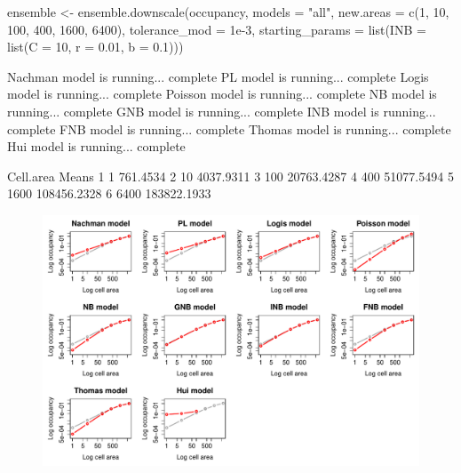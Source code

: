 \documentclass{article}[12pt, a4paper]
\begin{document}
\begin{Schunk}
\begin{Sinput}
ensemble <- ensemble.downscale(occupancy,
                               models = "all",
                               new.areas = c(1, 10, 100, 400, 1600, 6400),
                               tolerance_mod = 1e-3,
                               starting_params = list(INB = list(C = 10, 
                                                                 r = 0.01, 
                                                                 b = 0.1)))
\end{Sinput}
\begin{Soutput}
Nachman model is running...  complete 
PL model is running...  complete 
Logis model is running...  complete 
Poisson model is running...  complete 
NB model is running...  complete 
GNB model is running...  complete 
INB model is running...  complete 
FNB model is running...  complete 
Thomas model is running...  complete 
Hui model is running...  complete 





\end{Soutput}


\begin{Soutput}
  Cell.area       Means
1         1    761.4534
2        10   4037.9311
3       100  20763.4287
4       400  51077.5494
5      1600 108456.2328
6      6400 183822.1933
\end{Soutput}
\end{Schunk}

\begin{figure}[!ht]
\centering
\includegraphics[width=\linewidth]{Downscaling-downscale36}
\end{figure}
\end{document}

